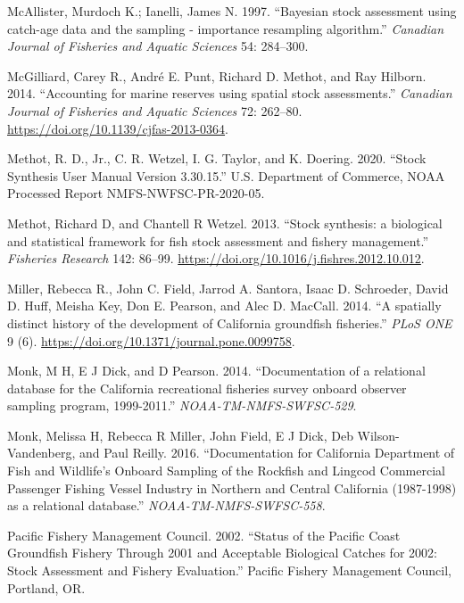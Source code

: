 \documentclass[
  english,
  a4paper,
]{article}
\newlength{\cslhangindent}
\newlength{\cslentryspacingunit} %
\newenvironment{CSLReferences}[2] %
 {%
  \setlength{\parindent}{0pt}
  \ifodd #1
  \let\oldpar\par
  \def\par{\hangindent=\cslhangindent\oldpar}
  \fi
  \setlength{\parskip}{#2\cslentryspacingunit}
 }%
 {}
\begin{document}
\begin{CSLReferences}{1}{0}
\leavevmode{}%
McAllister, Murdoch K.; Ianelli, James N. 1997. {``{Bayesian stock assessment using catch-age data and the sampling - importance resampling algorithm}.''} \emph{Canadian Journal of Fisheries and Aquatic Sciences} 54: 284--300.

\leavevmode{}%
McGilliard, Carey R., André E. Punt, Richard D. Methot, and Ray Hilborn. 2014. {``{Accounting for marine reserves using spatial stock assessments}.''} \emph{Canadian Journal of Fisheries and Aquatic Sciences} 72: 262--80. \url{https://doi.org/10.1139/cjfas-2013-0364}.

\leavevmode{}%
Methot, R. D., Jr., C. R. Wetzel, I. G. Taylor, and K. Doering. 2020. {``{Stock Synthesis User Manual Version 3.30.15}.''} U.S. Department of Commerce, NOAA Processed Report NMFS-NWFSC-PR-2020-05.

\leavevmode{}%
Methot, Richard D, and Chantell R Wetzel. 2013. {``{Stock synthesis: a biological and statistical framework for fish stock assessment and fishery management}.''} \emph{Fisheries Research} 142: 86--99. \url{https://doi.org/10.1016/j.fishres.2012.10.012}.

\leavevmode{}%
Miller, Rebecca R., John C. Field, Jarrod A. Santora, Isaac D. Schroeder, David D. Huff, Meisha Key, Don E. Pearson, and Alec D. MacCall. 2014. {``{A spatially distinct history of the development of California groundfish fisheries}.''} \emph{PLoS ONE} 9 (6). \url{https://doi.org/10.1371/journal.pone.0099758}.

\leavevmode{}%
Monk, M H, E J Dick, and D Pearson. 2014. {``{Documentation of a relational database for the California recreational fisheries survey onboard observer sampling program, 1999-2011}.''} \emph{NOAA-TM-NMFS-SWFSC-529}.

\leavevmode{}%
Monk, Melissa H, Rebecca R Miller, John Field, E J Dick, Deb Wilson-Vandenberg, and Paul Reilly. 2016. {``{Documentation for California Department of Fish and Wildlife's Onboard Sampling of the Rockfish and Lingcod Commercial Passenger Fishing Vessel Industry in Northern and Central California (1987-1998) as a relational database}.''} \emph{NOAA-TM-NMFS-SWFSC-558}.

\leavevmode{}%
Pacific Fishery Management Council. 2002. {``{Status of the Pacific Coast Groundfish Fishery Through 2001 and Acceptable Biological Catches for 2002: Stock Assessment and Fishery Evaluation.}''} Pacific Fishery Management Council, Portland, OR.


\end{CSLReferences}
\end{document}
